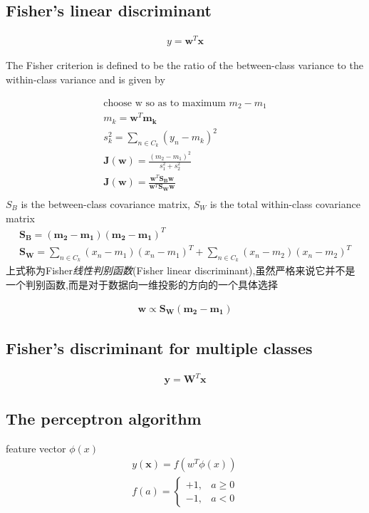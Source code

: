\documentclass[a4paper]{article}
\begin{document}
\subsection{Fisher’s linear discriminant}

\begin{align}
y = \mathbf{w}^T \mathbf{x}
\end{align}

The Fisher criterion is defined to be the ratio of the between-class variance to
 the within-class variance and is given by

\begin{align}
\text{choose w so as to maximum } m_2 - m_1\\
m_k = \mathbf{w}^T \mathbf{m_k}\\
s_k^2 = \displaystyle\sum_{n \in C_k}(y_n - m_k)^2\\
\mathbf{J}(\mathbf{w}) = \frac{(m_2 - m_1)^2}{s_1^2+s_2^2}\\
\mathbf{J}(\mathbf{w}) = \frac{\mathbf{w}^T \mathbf{S_B} \mathbf{w}}
  {\mathbf{w}^T \mathbf{S_W} \mathbf{w}}
\\
\end{align}
$S_B$ is the between-class covariance matrix,
 $S_W$ is the total within-class covariance matrix
\begin{align}
\mathbf{S_B} = (\mathbf{m_2} - \mathbf{m_1})(\mathbf{m_2} - \mathbf{m_1})^T\\
\mathbf{S_W} = \displaystyle\sum_{n \in C_k}(x_n - m_1) (x_n - m_1)^T +
\displaystyle\sum_{n \in C_k}(x_n - m_2) (x_n - m_2)^T
\end{align}
上式称为Fisher\emph{线性判别函数}(Fisher linear discriminant),虽然严格来说它并不是一个判别函数,而是对于数据向一维投影的方向的一个具体选择

\begin{align}
\mathbf{w} \propto  \mathbf{S_W} (\mathbf{m_2} - \mathbf{m_1})
\end{align}

\subsection{Fisher’s discriminant for multiple classes}
\begin{align}
\mathbf{y} = \mathbf{W}^T \mathbf{x}
\end{align}

\subsection{The perceptron algorithm}
feature vector $\phi(x)$
\begin{align}
y(\mathbf{x}) = f(w^T\phi(x))\\
f(a) =
  \begin{cases}
   +1, & a \geq 0 \\
   -1, & a < 0
  \end{cases}
\end{align}
\end{document}
